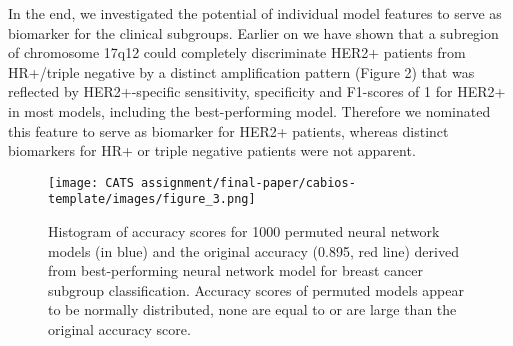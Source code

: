         In the end, we investigated the potential of individual model features to serve as biomarker for the clinical subgroups. Earlier on we have shown that a subregion of chromosome 17q12 could completely discriminate HER2+ patients from HR+/triple negative by a distinct amplification pattern (Figure 2) that was reflected by HER2+-specific sensitivity, specificity and F1-scores of 1 for HER2+ in most models, including the best-performing model. Therefore we nominated this feature to serve as biomarker for HER2+ patients, whereas distinct biomarkers for HR+ or triple negative patients were not apparent.
        
        \begin{figure}[]%
            \texttt{[image: CATS assignment/final-paper/cabios-template/images/figure\_3.png]}
            \caption{Histogram of accuracy scores for 1000 permuted neural network models (in blue) and the original accuracy (0.895, red line) derived from best-performing neural network model for breast cancer subgroup classification. Accuracy scores of permuted models appear to be normally distributed, none are equal to or are large than the original accuracy score.}\label{fig:03}
        \end{figure}
